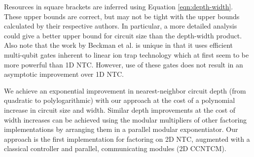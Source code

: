 \documentclass[twoside]{article}
\begin{document}
Resources in square brackets
are inferred using Equation \ref{eqn:depth-width}.
These upper bounds are correct,
but may not be tight with the upper bounds
calculated by their respective authors.
In particular, a more detailed analysis
could give a better upper bound for circuit size than the
depth-width product. Also note that the
work by Beckman et al. \cite{Beckman1996} is unique in that it uses
efficient multi-qubit gates inherent to linear ion trap technology which at first
seem to
be more powerful than \textsc{1D NTC}. However, use of these gates does not result in an
asymptotic improvement over \textsc{1D NTC}.

We achieve an exponential
improvement in nearest-neighbor circuit depth (from quadratic to polylogarithmic)
with our approach at the cost of a polynomial increase in
circuit size and width. Similar depth improvements at the cost of width increases can be achieved using the modular multipliers
of other factoring implementations
by arranging them in a parallel modular exponentiator.
Our approach is the first implementation for factoring on \textsc{2D NTC},
augmented with a classical controller and parallel, communicating
modules (\textsc{2D CCNTCM}).
%
\end{document}

